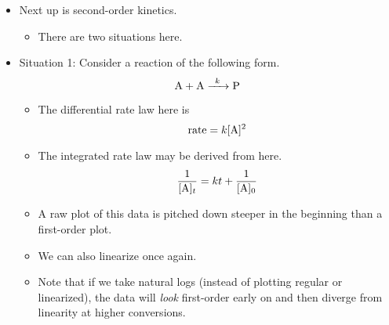 \documentclass[../notes.tex]{subfiles}
\begin{document}
\begin{itemize}
\begin{itemize}
        \item We can derive this by substituting $\cnc[$t_{1/2}$]{A}=\cnc[0]{A}/2$ into the integrated rate law.
        \item Importantly, the half-life does not depend on $\cnc{A}$!
        \begin{itemize}
            \item On a plot, this means that each time a half-life elapses, the concentration of $\cnc{A}$ has halved.
        \end{itemize}
        \item First-order reactions move faster at the beginning than at any other time, so if you go into lab and your reaction is not working early on, it's not then just going to start working later! You should probably cut your losses and change something.
        \item Also tells you how many half-lives you'd need in order to achieve a certain desired conversion.
    \end{itemize}
    \item Next up is second-order kinetics.
    \begin{itemize}
        \item There are two situations here.
    \end{itemize}
    \item Situation 1: Consider a reaction of the following form.
    \begin{equation*}
        \ce{A + A ->[$k$] P}
    \end{equation*}
    \begin{itemize}
        \item The differential rate law here is
        \begin{equation*}
            \rate = k\cnc{A}^2
        \end{equation*}
        \item The integrated rate law may be derived from here.
        \begin{equation*}
            \frac{1}{\cnc[$t$]{A}} = kt+\frac{1}{\cnc[0]{A}}
        \end{equation*}
        \item A raw plot of this data is pitched down steeper in the beginning than a first-order plot.
        \item We can also linearize once again.
        \item Note that if we take natural logs (instead of plotting regular or linearized), the data will \emph{look} first-order early on and then diverge from linearity at higher conversions.

\end{itemize}
\end{itemize}
\end{document}
